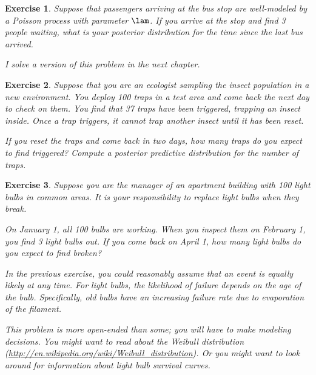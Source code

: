 \documentclass[12pt]{book}
\theoremstyle{exercise}
\newtheorem{exercise}{Exercise}[chapter]
\begin{document}
\begin{exercise}

Suppose that passengers arriving at the bus stop are well-modeled
by a Poisson process with parameter $\lam$.  If you arrive at the
stop and find 3 people waiting, what is your posterior distribution
for the time since the last bus arrived.

I solve a version of this problem in the next chapter.

\end{exercise}


\begin{exercise}

Suppose that you are an ecologist sampling the insect population in
a new environment.  You deploy 100 traps in a test area and come back
the next day to check on them.  You find that 37 traps have been
triggered, trapping an insect inside.  Once a trap triggers, it
cannot trap another insect until it has been reset.

If you reset the traps and come back in two days, how many traps
do you expect to find triggered?  Compute a posterior predictive
distribution for the number of traps.

\end{exercise}


\begin{exercise}

Suppose you are the manager of an apartment building with
100 light bulbs in common areas.  It is your responsibility
to replace light bulbs when they break.

On January 1, all 100 bulbs are working.  When you inspect
them on February 1, you find 3 light bulbs out.  If you
come back on April 1, how many light bulbs do you expect to
find broken?

In the previous exercise, you could reasonably assume that an event is
equally likely at any time.  For light bulbs, the likelihood of
failure depends on the age of the bulb.  Specifically, old bulbs
have an increasing failure rate due to evaporation of the filament.

This problem is more open-ended than some; you will have to make
modeling decisions.  You might want to read about the Weibull
distribution
(\url{http://en.wikipedia.org/wiki/Weibull_distribution}).
Or you might want to look around for information about
light bulb survival curves.

\end{exercise}
\end{document}
